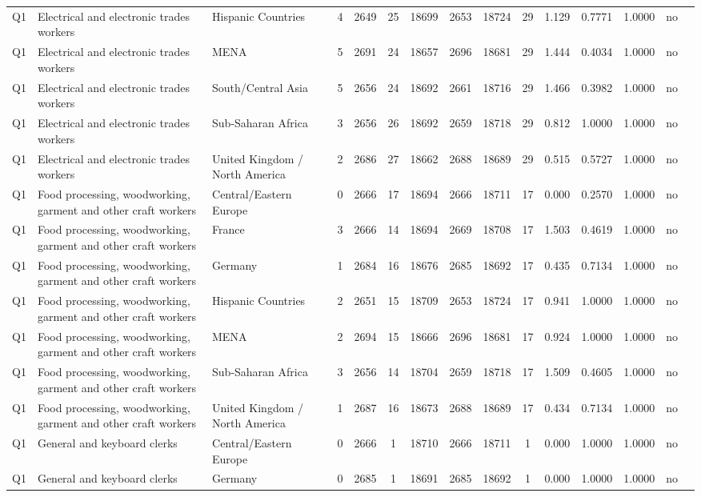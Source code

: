 \begin{longtable}{lllrcccccccccll}
Q1 & Electrical and electronic trades workers & Hispanic Countries & 4 & 2649 & 25 & 18699 & 2653 & 18724 & 29 & 1.129 & 0.7771 & 1.0000 & no \\
Q1 & Electrical and electronic trades workers & MENA & 5 & 2691 & 24 & 18657 & 2696 & 18681 & 29 & 1.444 & 0.4034 & 1.0000 & no \\
Q1 & Electrical and electronic trades workers & South/Central Asia & 5 & 2656 & 24 & 18692 & 2661 & 18716 & 29 & 1.466 & 0.3982 & 1.0000 & no \\
Q1 & Electrical and electronic trades workers & Sub-Saharan Africa & 3 & 2656 & 26 & 18692 & 2659 & 18718 & 29 & 0.812 & 1.0000 & 1.0000 & no \\
Q1 & Electrical and electronic trades workers & United Kingdom / North America & 2 & 2686 & 27 & 18662 & 2688 & 18689 & 29 & 0.515 & 0.5727 & 1.0000 & no \\
Q1 & Food processing, woodworking, garment and other craft workers & Central/Eastern Europe & 0 & 2666 & 17 & 18694 & 2666 & 18711 & 17 & 0.000 & 0.2570 & 1.0000 & no \\
Q1 & Food processing, woodworking, garment and other craft workers & France & 3 & 2666 & 14 & 18694 & 2669 & 18708 & 17 & 1.503 & 0.4619 & 1.0000 & no \\
Q1 & Food processing, woodworking, garment and other craft workers & Germany & 1 & 2684 & 16 & 18676 & 2685 & 18692 & 17 & 0.435 & 0.7134 & 1.0000 & no \\
Q1 & Food processing, woodworking, garment and other craft workers & Hispanic Countries & 2 & 2651 & 15 & 18709 & 2653 & 18724 & 17 & 0.941 & 1.0000 & 1.0000 & no \\
Q1 & Food processing, woodworking, garment and other craft workers & MENA & 2 & 2694 & 15 & 18666 & 2696 & 18681 & 17 & 0.924 & 1.0000 & 1.0000 & no \\
Q1 & Food processing, woodworking, garment and other craft workers & Sub-Saharan Africa & 3 & 2656 & 14 & 18704 & 2659 & 18718 & 17 & 1.509 & 0.4605 & 1.0000 & no \\
Q1 & Food processing, woodworking, garment and other craft workers & United Kingdom / North America & 1 & 2687 & 16 & 18673 & 2688 & 18689 & 17 & 0.434 & 0.7134 & 1.0000 & no \\
Q1 & General and keyboard clerks & Central/Eastern Europe & 0 & 2666 & 1 & 18710 & 2666 & 18711 & 1 & 0.000 & 1.0000 & 1.0000 & no \\
Q1 & General and keyboard clerks & Germany & 0 & 2685 & 1 & 18691 & 2685 & 18692 & 1 & 0.000 & 1.0000 & 1.0000 & no \\

\end{longtable}
